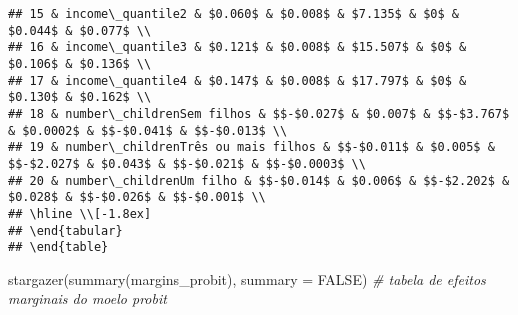 \documentclass[
]{article}
\newenvironment{Shaded}{\begin{snugshade}}{\end{snugshade}}
\newcommand{\AttributeTok}[1]{\textcolor[rgb]{0.77,0.63,0.00}{#1}}
\newcommand{\CommentTok}[1]{\textcolor[rgb]{0.56,0.35,0.01}{\textit{#1}}}
\newcommand{\ConstantTok}[1]{\textcolor[rgb]{0.00,0.00,0.00}{#1}}
\newcommand{\FunctionTok}[1]{\textcolor[rgb]{0.00,0.00,0.00}{#1}}
\newcommand{\NormalTok}[1]{#1}
\begin{document}
\begin{verbatim}
## 15 & income\_quantile2 & $0.060$ & $0.008$ & $7.135$ & $0$ & $0.044$ & $0.077$ \\ 
## 16 & income\_quantile3 & $0.121$ & $0.008$ & $15.507$ & $0$ & $0.106$ & $0.136$ \\ 
## 17 & income\_quantile4 & $0.147$ & $0.008$ & $17.797$ & $0$ & $0.130$ & $0.162$ \\ 
## 18 & number\_childrenSem filhos & $$-$0.027$ & $0.007$ & $$-$3.767$ & $0.0002$ & $$-$0.041$ & $$-$0.013$ \\ 
## 19 & number\_childrenTrês ou mais filhos & $$-$0.011$ & $0.005$ & $$-$2.027$ & $0.043$ & $$-$0.021$ & $$-$0.0003$ \\ 
## 20 & number\_childrenUm filho & $$-$0.014$ & $0.006$ & $$-$2.202$ & $0.028$ & $$-$0.026$ & $$-$0.001$ \\ 
## \hline \\[-1.8ex] 
## \end{tabular} 
## \end{table}
\end{verbatim}

\begin{Shaded}
\begin{Highlighting}[]
\FunctionTok{stargazer}\NormalTok{(}\FunctionTok{summary}\NormalTok{(margins\_probit), }\AttributeTok{summary =} \ConstantTok{FALSE}\NormalTok{) }\CommentTok{\# tabela de efeitos marginais do moelo probit}
\end{Highlighting}
\end{Shaded}
\end{document}
